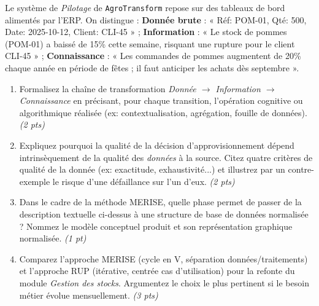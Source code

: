 \documentclass[11pt]{article}
\begin{document}
\begin{exercice}
\label{exo:model_decision}
Le système de \textit{Pilotage} de \texttt{AgroTransform} repose sur des tableaux de bord alimentés par l'ERP. On distingue : \textbf{Donnée brute} : « Réf: POM-01, Qté: 500, Date: 2025-10-12, Client: CLI-45 » ; \textbf{Information} : « Le stock de pommes (POM-01) a baissé de 15\% cette semaine, risquant une rupture pour le client CLI-45 » ; \textbf{Connaissance} : « Les commandes de pommes augmentent de 20\% chaque année en période de fêtes ; il faut anticiper les achats dès septembre ».
\begin{enumerate}
    \item Formalisez la chaîne de transformation \textit{Donnée $\to$ Information $\to$ Connaissance} en précisant, pour chaque transition, l'opération cognitive ou algorithmique réalisée (ex: contextualisation, agrégation, fouille de données). \textit{(2 pts)}
    \item Expliquez pourquoi la qualité de la décision d'approvisionnement dépend intrinsèquement de la qualité des \textit{données} à la source. Citez quatre critères de qualité de la donnée (ex: exactitude, exhaustivité...) et illustrez par un contre-exemple le risque d'une défaillance sur l'un d'eux. \textit{(2 pts)}
    \item Dans le cadre de la méthode MERISE, quelle phase permet de passer de la description textuelle ci-dessus à une structure de base de données normalisée ? Nommez le modèle conceptuel produit et son représentation graphique normalisée. \textit{(1 pt)}
    \item Comparez l'approche MERISE (cycle en V, séparation données/traitements) et l'approche RUP (itérative, centrée cas d'utilisation) pour la refonte du module \textit{Gestion des stocks}. Argumentez le choix le plus pertinent si le besoin métier évolue mensuellement. \textit{(3 pts)}
\end{enumerate}
\end{exercice}
\end{document}
